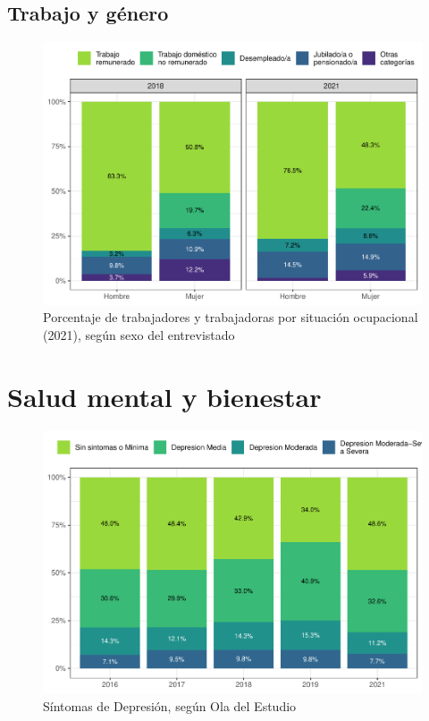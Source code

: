 \documentclass[
  12pt,
  openany]{book}
\begin{document}
\hypertarget{trabajo-y-guxe9nero}{%
\section{Trabajo y género}\label{trabajo-y-guxe9nero}}

\begin{figure}

{\centering \includegraphics{reporte-elsoc_files/figure-latex/ocup-sexo-1} 

}

\caption{Porcentaje de trabajadores y trabajadoras por situación ocupacional (2021), según sexo del entrevistado}\label{fig:ocup-sexo}
\end{figure}

\hypertarget{salud-mental-y-bienestar}{%
\chapter{Salud mental y bienestar}\label{salud-mental-y-bienestar}}

\begin{figure}

{\centering \includegraphics{reporte-elsoc_files/figure-latex/depre-wave-1} 

}

\caption{Síntomas de Depresión, según Ola del Estudio}\label{fig:depre-wave}
\end{figure}
\end{document}
